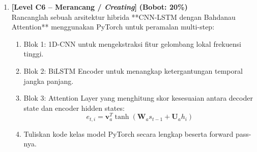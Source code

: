 \documentclass[11pt,a4paper]{article}
\begin{document}
\begin{enumerate}[leftmargin=1.5em, label=\textbf{Soal \arabic*.}]
    \vspace{0.4cm}

    \item \textbf{[Level C6 -- Merancang / \textit{Creating}]} \hfill \textbf{(Bobot: 20\%)} \\
    Rancanglah sebuah arsitektur hibrida **CNN-LSTM dengan Bahdanau Attention** menggunakan PyTorch untuk peramalan multi-step:
    \begin{enumerate}[label=\alph*.]
        \item Blok 1: 1D-CNN untuk mengekstraksi fitur gelombang lokal frekuensi tinggi.
        \item Blok 2: BiLSTM Encoder untuk menangkap ketergantungan temporal jangka panjang.
        \item Blok 3: Attention Layer yang menghitung skor kesesuaian antara decoder state dan encoder hidden states:
        \begin{equation*}
            e_{t,i} = \mathbf{v}_a^T \tanh(\mathbf{W}_a s_{t-1} + \mathbf{U}_a h_i)
        \end{equation*}
        \item Tuliskan kode kelas model PyTorch secara lengkap beserta forward pass-nya.
    \end{enumerate}

\end{enumerate}
\end{document}
